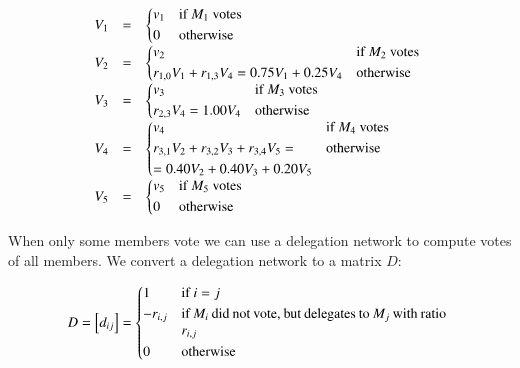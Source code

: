 \documentclass{sigchi}
\begin{document}
\begin{displaymath}
\begin{array}{rcl}
V_1 & = & \begin{dcases*}
 v_1 & if $M_1$ votes \\
 0 & otherwise \\
\end{dcases*} \\
V_2 & = & \begin{dcases*}
 v_2 & if $M_2$ votes \\
 r_{1,0} V_1 + r_{1,3} V_4 = 0.75 V_1 + 0.25 V_4 & otherwise \\
\end{dcases*} \\
V_3 & = & \begin{dcases*}
 v_3 & if $M_3$ votes \\
 r_{2,3} V_4 = 1.00 V_4 & otherwise \\
\end{dcases*} \\
V_4 & = & \begin{dcases*}
 v_4 & if $M_4$ votes \\
 r_{3,1} V_2+ r_{3,2} V_3 + r_{3,4} V_5 = & otherwise \\
 = 0.40 V_2 + 0.40 V_3 + 0.20 V_5 & \\
\end{dcases*} \\
V_5 & = & \begin{dcases*}
 v_5 & if $M_5$ votes \\
 0 & otherwise \\
\end{dcases*} \\
\end{array}
\end{displaymath}

When only some members vote we can use a delegation network to compute votes
of all members.
We convert a delegation network to a matrix $D$:

\begin{displaymath}
D = \left[d_{ij}\right] = \begin{dcases*}
 1 & if $i = j$ \\
 -r_{i,j} & \parbox[t]{.55\columnwidth}{if $M_i$ did not vote, but delegates to $M_j$ with ratio $r_{i,j}$} \\
 0 & otherwise \\
\end{dcases*}
\end{displaymath}
\end{document}
